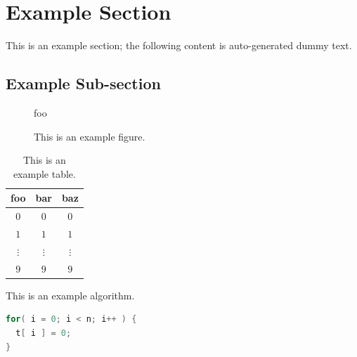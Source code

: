\section{Example Section}

This is an example section;
the following content is auto-generated dummy text.

\subsection{Example Sub-section}

\begin{figure}[t]
\centering
foo
\caption{This is an example figure.}
\label{fig}
\end{figure}

\begin{table}[t]
\centering
\begin{tabular}{|cc|c|}
\hline
foo      & bar      & baz      \\
\hline
$0     $ & $0     $ & $0     $ \\
$1     $ & $1     $ & $1     $ \\
$\vdots$ & $\vdots$ & $\vdots$ \\
$9     $ & $9     $ & $9     $ \\
\hline
\end{tabular}
\caption{This is an example table.}
\label{tab}
\end{table}

\begin{algorithm}[t]
\caption{This is an example algorithm.}
\label{alg}
\end{algorithm}

\begin{lstlisting}[float={t},caption={This is an example listing.},label={lst},language=C]
for( i = 0; i < n; i++ ) {
  t[ i ] = 0;
}
\end{lstlisting}
